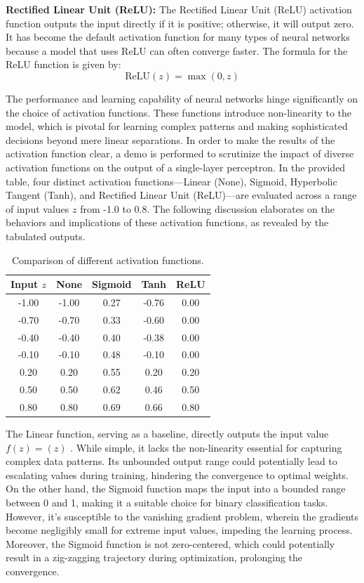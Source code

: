 \documentclass[10pt,twocolumn,letterpaper]{article}
\begin{document}
\textbf{Rectified Linear Unit (ReLU):}
The Rectified Linear Unit (ReLU) activation function outputs the input directly if it is positive; otherwise, it will output zero. It has become the default activation function for many types of neural networks because a model that uses ReLU can often converge faster. The formula for the ReLU function is given by:
\[
   \text{ReLU}(z) = \max(0, z)
\]

The performance and learning capability of neural networks hinge significantly on the choice of activation functions. These functions introduce non-linearity to the model, which is pivotal for learning complex patterns and making sophisticated decisions beyond mere linear separations. In order to make the results of the activation function clear, a demo is performed to scrutinize the impact of diverse activation functions on the output of a single-layer perceptron. In the provided table, four distinct activation functions—Linear (None), Sigmoid, Hyperbolic Tangent (Tanh), and Rectified Linear Unit (ReLU)—are evaluated across a range of input values \( z \) from -1.0 to 0.8. The following discussion elaborates on the behaviors and implications of these activation functions, as revealed by the tabulated outputs.

\begin{table}[h]
   \centering
   \begin{tabular}{|c|c|c|c|c|}
      \hline
      Input \( z \) & None  & Sigmoid & Tanh  & ReLU \\
      \hline
      -1.00         & -1.00 & 0.27    & -0.76 & 0.00 \\
      -0.70         & -0.70 & 0.33    & -0.60 & 0.00 \\
      -0.40         & -0.40 & 0.40    & -0.38 & 0.00 \\
      -0.10         & -0.10 & 0.48    & -0.10 & 0.00 \\
      0.20          & 0.20  & 0.55    & 0.20  & 0.20 \\
      0.50          & 0.50  & 0.62    & 0.46  & 0.50 \\
      0.80          & 0.80  & 0.69    & 0.66  & 0.80 \\
      \hline
   \end{tabular}
   \caption{Comparison of different activation functions.}
   \label{tab:activation_functions}
\end{table}

The Linear function, serving as a baseline, directly outputs the input value $f(z) = ( z )$ . While simple, it lacks the non-linearity essential for capturing complex data patterns. Its unbounded output range could potentially lead to escalating values during training, hindering the convergence to optimal weights. On the other hand, the Sigmoid function maps the input into a bounded range between 0 and 1, making it a suitable choice for binary classification tasks. However, it's susceptible to the vanishing gradient problem, wherein the gradients become negligibly small for extreme input values, impeding the learning process. Moreover, the Sigmoid function is not zero-centered, which could potentially result in a zig-zagging trajectory during optimization, prolonging the convergence.
\end{document}
